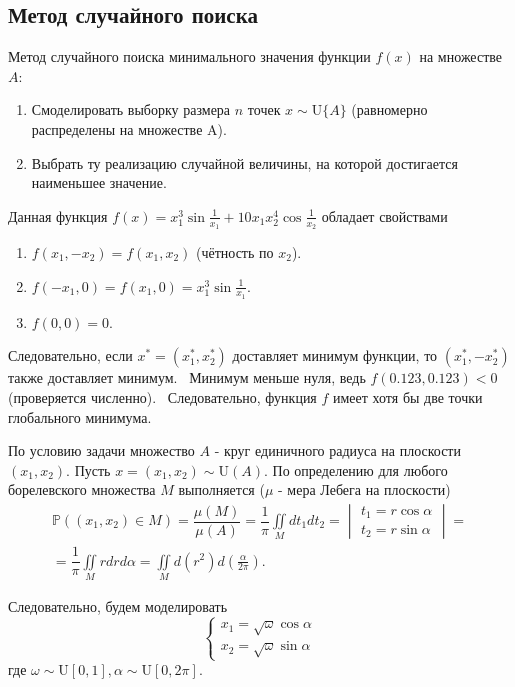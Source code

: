 \documentclass[11pt]{report}
\begin{document}
\subsection{Метод случайного поиска}

Метод случайного поиска минимального значения функции $f(x)$ на множестве $A$:
\begin{enumerate}
\item Смоделировать выборку размера $n$ точек $x\sim\mathrm{U}\{A\}$ (равномерно распределены на множестве A).
\item Выбрать ту реализацию случайной величины, на которой достигается наименьшее значение.
\end{enumerate}

Данная функция $f(x)=x_1^3\sin\frac{1}{x_1}+10x_1x_2^4\cos\frac{1}{x_2}$ обладает свойствами
\begin{enumerate}
\item $f(x_1,-x_2)=f(x_1,x_2)$ (чётность по $x_2$).
\item $f(-x_1,0)=f(x_1,0)=x_1^3\sin\frac{1}{x_1}$.
\item $f(0,0)=0$.
\end{enumerate}

Следовательно, если $x^*=(x_1^*,x_2^*)$ доставляет минимум функции, то $(x_1^*,-x_2^*)$ также доставляет минимум. \
Минимум меньше нуля, ведь $f(0.123, 0.123) < 0$ (проверяется численно). \
Следовательно, функция $f$ имеет хотя бы две точки глобального минимума.

По условию задачи множество $A$ - круг единичного радиуса на плоскости $(x_1,x_2)$. Пусть $x=(x_1,x_2)\sim\mathrm{U}(A)$. По определению для любого борелевского множества $M$ выполняется ($\mu$ - мера Лебега на плоскости)
\begin{multline*}
\mathbb{P}\left( (x_1,x_2)\in M \right) = \dfrac{\mu (M)}{\mu (A)} = \dfrac{1}{\pi}\iint\limits_M dt_1dt_2 = \begin{vmatrix}
t_1 = r\cos\alpha \\
t_2 = r\sin\alpha
\end{vmatrix} =\\
= \dfrac{1}{\pi}\iint\limits_M rdrd\alpha = \iint\limits_M d(r^2)d\left(\frac{\alpha}{2\pi}\right).
\end{multline*}

Следовательно, будем моделировать
$$
\begin{cases}
x_1 = \sqrt{\omega}\cos\alpha \\
x_2 = \sqrt{\omega}\sin\alpha
\end{cases}
$$
где $\omega\sim\mathrm{U}[0,1], \alpha\sim\mathrm{U}[0,2\pi]$.
\end{document}
